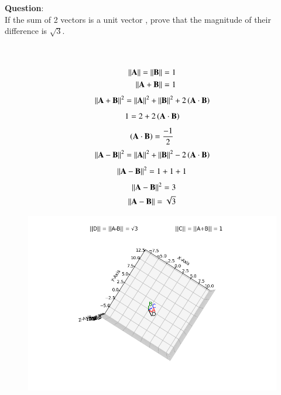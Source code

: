 \documentclass[journal]{IEEEtran}
\begin{document}
\textbf{Question}:\\
If the sum of 2 vectors is a unit vector , prove that the magnitude of their difference is $\sqrt{3}$.\hfill{}\\
\\ \solution \\
    \begin{table}[h!]    
      \centering
      
    \end{table}
    \begin{align}
        \left\vert\left\vert\mathbf{A}\right\vert\right\vert = \left\vert\left\vert\mathbf{B}\right\vert\right\vert = 1 \\ \label{eq1.11.12.1}
        \left\vert\left\vert\mathbf{A}+\mathbf{B}\right\vert\right\vert = 1 
    \end{align}
    \begin{align}
        \left\vert\left\vert\mathbf{A}+\mathbf{B}\right\vert\right\vert^2 = \left\vert\left\vert\mathbf{A}\right\vert\right\vert^2 + \left\vert\left\vert\mathbf{B}\right\vert\right\vert^2 + 2\left(\mathbf{A} \cdot \mathbf{B}\right)\label{eq1.11.12.2}
    \end{align}
    \begin{align}
        1 = 2 + 2\left(\mathbf{A} \cdot \mathbf{B}\right) \label{eq1.11.12.3}
    \end{align}
    \begin{align}
        \left(\mathbf{A} \cdot \mathbf{B}\right) = \frac{-1}{2} \label{eq1.11.12.4}
    \end{align}
    \begin{align}
        \left\vert\left\vert\mathbf{A}-\mathbf{B}\right\vert\right\vert^2 = \left\vert\left\vert\mathbf{A}\right\vert\right\vert^2 + \left\vert\left\vert\mathbf{B}\right\vert\right\vert^2 - 2\left(\mathbf{A} \cdot \mathbf{B}\right) \label{1.11.12.5}
    \end{align}
    \begin{align}
        \left\vert\left\vert\mathbf{A}-\mathbf{B}\right\vert\right\vert^2 = 1 + 1 + 1 \label{1.11.12.6} 
    \end{align}
    \begin{align}
        \left\vert\left\vert\mathbf{A}-\mathbf{B}\right\vert\right\vert^2 = 3 \\
        \left\vert\left\vert\mathbf{A}-\mathbf{B}\right\vert\right\vert = \sqrt{3}
    \end{align}
    \begin{figure}[h]
        \centering
       \includegraphics[width=\linewidth]{figs/fig1.png}
       \caption{}
       \label{graph}
    \end{figure}
\end{document}
